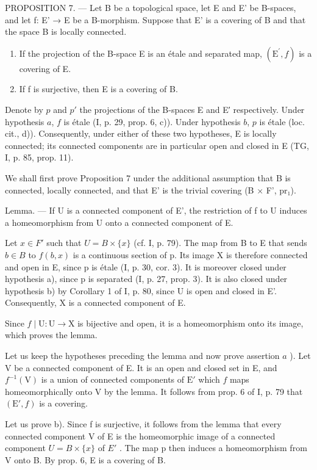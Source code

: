PROPOSITION 7. --- Let B be a topological space, let E and E' be B-spaces, and let f: E' → E be a B-morphism. Suppose that E' is a covering of B and that the space B is locally connected.

\begin{enumerate}
\def\labelenumi{\alph{enumi})}
\item
  If the projection of the B-space E is an étale and separated map, \((\mathrm{E}^{\prime}, f)\) is a covering of E.
\item
  If f is surjective, then E is a covering of B.
\end{enumerate}

Denote by \(p\) and \(p'\) the projections of the B-spaces E and E′ respectively. Under hypothesis \(a\), \(f\) is étale (I, p. 29, prop. 6, c)). Under hypothesis \(b\), \(p\) is étale (loc. cit., d)). Consequently, under either of these two hypotheses, E is locally connected; its connected components are in particular open and closed in E (TG, I, p. 85, prop. 11).

We shall first prove Proposition 7 under the additional assumption that B is connected, locally connected, and that E' is the trivial covering (B × F', pr₁).

Lemma. --- If U is a connected component of E', the restriction of f to U induces a homeomorphism from U onto a connected component of E.

Let \(x \in F'\) such that \(U = B \times \{x\}\) (cf. I, p. 79). The map from B to E that sends \(b \in B\) to \(f(b, x)\) is a continuous section of p. Its image X is therefore connected and open in E, since p is étale (I, p. 30, cor. 3). It is moreover closed under hypothesis a), since p is separated (I, p. 27, prop. 3). It is also closed under hypothesis b) by Corollary 1 of I, p. 80, since U is open and closed in E'. Consequently, X is a connected component of E.

Since \(f \mid \mathrm{U} \colon \mathrm{U} \to \mathrm{X}\) is bijective and open, it is a homeomorphism onto its image, which proves the lemma.

Let us keep the hypotheses preceding the lemma and now prove assertion \(a\) ). Let V be a connected component of E. It is an open and closed set in E, and \(f^{-1}(\mathrm{V})\) is a union of connected components of \(\mathrm{E}'\) which \(f\) maps homeomorphically onto V by the lemma. It follows from prop. 6 of I, p. 79 that \((\mathrm{E}', f)\) is a covering.

Let us prove b). Since f is surjective, it follows from the lemma that every connected component V of E is the homeomorphic image of a connected component \(U = B \times \{x\}\) of \(E'\) . The map p then induces a homeomorphism from V onto B. By prop. 6, E is a covering of B.

